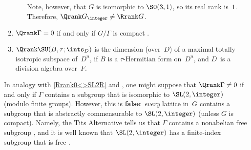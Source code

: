 \begin{egs}
\begin{enumerate}
\begin{enumerate}
		
		Note, however, that $G$ is isomorphic to $\SO(3,1)$, so its real rank is~$1$. Therefore, $\Qrank G_\integer \neq \Rrank G$.
%
		\end{enumerate}
	
	\item \label{QrankEg-0}
	$\Qrank \Gamma = 0$ if and only if $G/\Gamma$ is compact .

	\item \label{QrankEg-SUD}
	$\Qrank \SU(B, \tau; \ints_D)$ is the dimension (over~$D$) of a maximal totally isotropic subspace of~$D^n$, if $B$ is a $\tau$-Hermitian form on~$D^n$, and $D$~is a division algebra over~$F$.
	
	 \end{enumerate}
 \end{egs}

\begin{warn} \label{SL2ZinGamma}
 In analogy with \cref{Rrank0<>SL2R} and
, one might suppose that
$\Qrank \Gamma \neq 0$ if and only if $\Gamma$
contains a subgroup that is isomorphic to
$\SL(2,\integer)$ (modulo finite groups). However, this
is \textbf{false}: \emph{every} lattice in~$G$ contains a
subgroup that is abstractly commensurable to
$\SL(2,\integer)$ (unless $G$ is compact). Namely, the Tits Alternative tells us that $\Gamma$ contains a nonabelian free subgroup ,
and it is well known that $\SL(2,\integer)$ has a
finite-index subgroup that is free .
 \end{warn}


